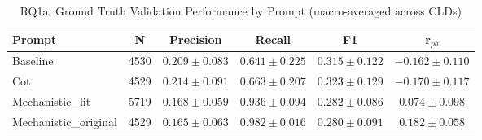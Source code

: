 \begin{table}[htbp]
\centreing
\caption{RQ1a: Ground Truth Validation Performance by Prompt (macro-averaged across CLDs)}
\label{tab:rq1a_gt_by_prompt}
\begin{tabular}{lccccc}
\toprule
\textbf{Prompt} & \textbf{N} & \textbf{Precision} & \textbf{Recall} & \textbf{F1} & \textbf{r$_{pb}$} \\
\midrule
Baseline & 4530 & $0.209 \pm 0.083$ & $0.641 \pm 0.225$ & $0.315 \pm 0.122$ & $-0.162 \pm 0.110$ \\
Cot & 4529 & $0.214 \pm 0.091$ & $0.663 \pm 0.207$ & $0.323 \pm 0.129$ & $-0.170 \pm 0.117$ \\
Mechanistic_lit & 5719 & $0.168 \pm 0.059$ & $0.936 \pm 0.094$ & $0.282 \pm 0.086$ & $0.074 \pm 0.098$ \\
Mechanistic_original & 4529 & $0.165 \pm 0.063$ & $0.982 \pm 0.016$ & $0.280 \pm 0.091$ & $0.182 \pm 0.058$ \\
\bottomrule
\end{tabular}
\end{table}
